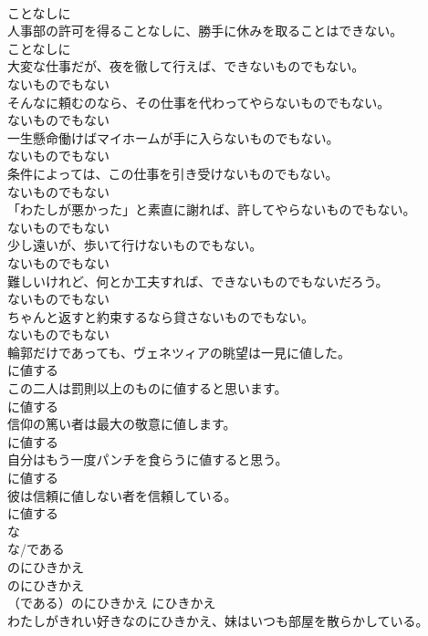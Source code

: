 \documentclass[8pt]{extreport}
\begin{document}
\begin{CJK}{UTF8}{min}
\\	ことなしに	
\\	人事部の許可を得ることなしに、勝手に休みを取ることはできない。	
\\	ことなしに	
\\	大変な仕事だが、夜を徹して行えば、できないものでもない。	
\\	ないものでもない	
\\	そんなに頼むのなら、その仕事を代わってやらないものでもない。	
\\	ないものでもない	
\\	一生懸命働けばマイホームが手に入らないものでもない。	
\\	ないものでもない	
\\	条件によっては、この仕事を引き受けないものでもない。	
\\	ないものでもない	
\\	「わたしが悪かった」と素直に謝れば、許してやらないものでもない。	
\\	ないものでもない	
\\	少し遠いが、歩いて行けないものでもない。	
\\	ないものでもない	
\\	難しいけれど、何とか工夫すれば、できないものでもないだろう。	
\\	ないものでもない	
\\	ちゃんと返すと約束するなら貸さないものでもない。	
\\	ないものでもない	
\\	輪郭だけであっても、ヴェネツィアの眺望は一見に値した。	
\\	に値する	
\\	この二人は罰則以上のものに値すると思います。	
\\	に値する	
\\	信仰の篤い者は最大の敬意に値します。	
\\	に値する	
\\	自分はもう一度パンチを食らうに値すると思う。	
\\	に値する	
\\	彼は信頼に値しない者を信頼している。	
\\	に値する	
\\	な
\\	な/である 
\\	のにひきかえ	
\\	のにひきかえ	
\\	（である）のにひきかえ	にひきかえ	
\\	わたしがきれい好きなのにひきかえ、妹はいつも部屋を散らかしている。	

\end{CJK}
\end{document}

